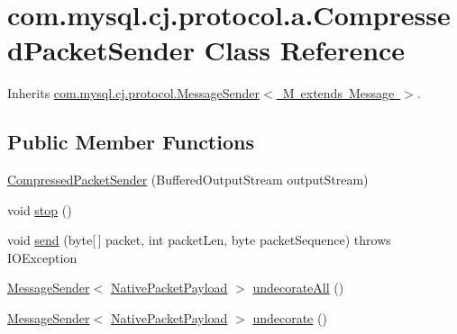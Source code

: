\hypertarget{classcom_1_1mysql_1_1cj_1_1protocol_1_1a_1_1_compressed_packet_sender}{}\section{com.\+mysql.\+cj.\+protocol.\+a.\+Compressed\+Packet\+Sender Class Reference}
\label{classcom_1_1mysql_1_1cj_1_1protocol_1_1a_1_1_compressed_packet_sender}


Inherits \mbox{\hyperlink{interfacecom_1_1mysql_1_1cj_1_1protocol_1_1_message_sender}{com.\+mysql.\+cj.\+protocol.\+Message\+Sender$<$ M extends Message $>$}}.

\subsection*{Public Member Functions}
\begin{DoxyCompactItemize}
\item 
\mbox{\hyperlink{classcom_1_1mysql_1_1cj_1_1protocol_1_1a_1_1_compressed_packet_sender_ab6d47e91936124c65c9c980ed73af907}{Compressed\+Packet\+Sender}} (Buffered\+Output\+Stream output\+Stream)
\item 
void \mbox{\hyperlink{classcom_1_1mysql_1_1cj_1_1protocol_1_1a_1_1_compressed_packet_sender_a5491c16d427d8343f0417b9e5bebd1f1}{stop}} ()
\item 
void \mbox{\hyperlink{classcom_1_1mysql_1_1cj_1_1protocol_1_1a_1_1_compressed_packet_sender_a643c7e9a053e2704786f8319ef8a06e7}{send}} (byte\mbox{[}$\,$\mbox{]} packet, int packet\+Len, byte packet\+Sequence)  throws I\+O\+Exception 
\item 
\mbox{\hyperlink{interfacecom_1_1mysql_1_1cj_1_1protocol_1_1_message_sender}{Message\+Sender}}$<$ \mbox{\hyperlink{classcom_1_1mysql_1_1cj_1_1protocol_1_1a_1_1_native_packet_payload}{Native\+Packet\+Payload}} $>$ \mbox{\hyperlink{classcom_1_1mysql_1_1cj_1_1protocol_1_1a_1_1_compressed_packet_sender_a06ec74d67adf77498b1f95148cd59323}{undecorate\+All}} ()
\item 
\mbox{\hyperlink{interfacecom_1_1mysql_1_1cj_1_1protocol_1_1_message_sender}{Message\+Sender}}$<$ \mbox{\hyperlink{classcom_1_1mysql_1_1cj_1_1protocol_1_1a_1_1_native_packet_payload}{Native\+Packet\+Payload}} $>$ \mbox{\hyperlink{classcom_1_1mysql_1_1cj_1_1protocol_1_1a_1_1_compressed_packet_sender_a3784dddfd77b45c384a6bb19f67fc2cc}{undecorate}} ()
\end{DoxyCompactItemize}
